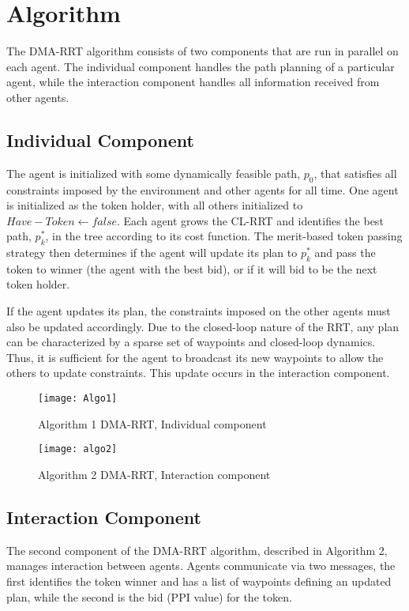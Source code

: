 \documentclass[a4paper]{article}
\begin{document}
\section{Algorithm}
The DMA-RRT algorithm consists of two components that are run in parallel on each agent. The individual component handles the path planning of a particular agent, while the interaction
component handles all information received from other agents.

\subsection{Individual Component}
The agent is initialized with some dynamically feasible path, $p_{0}$, that satisfies all
constraints imposed by the environment and other agents for all time. One agent is initialized as the token holder, with all others initialized to $Have-Token \longleftarrow false$. Each agent grows the CL-RRT and identifies the best path, $p^{*}_{k}$, in the tree according to its cost function. The merit-based token passing strategy then determines if the agent will update its plan to $p^{*}_{k}$ and pass the token to winner (the agent with the best bid), or if it will bid to be the next token holder.

If the agent updates its plan, the constraints imposed on the other agents must also be updated accordingly. Due to the closed-loop nature of the RRT, any plan can be characterized by a sparse set of waypoints and closed-loop dynamics. Thus, it is sufficient for the agent to broadcast its new waypoints to allow the others to update constraints. This update occurs in the interaction component.

\begin{figure}
\centering
  \texttt{[image: Algo1]}
  \caption{Algorithm 1 DMA-RRT, Individual component}
  \label{fgr:example}
\end{figure}
\begin{figure}
\centering
  \texttt{[image: algo2]}
  \caption{Algorithm 2 DMA-RRT, Interaction component}
  \label{fgr:example}
\end{figure}
\subsection{Interaction Component}
The second component of the DMA-RRT algorithm, described in Algorithm 2, manages interaction between agents. Agents communicate via two messages, the first identifies the token winner and has a list of waypoints defining an updated plan, while the second is the bid (PPI value) for the token.
\end{document}

